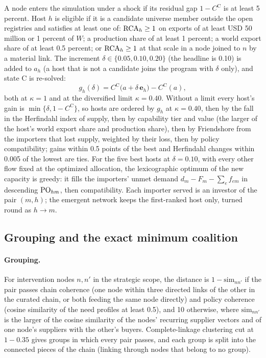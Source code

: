 A node enters the simulation under a shock if its residual gap $1-C^{\mathrm C}$ is at least 5
percent. Host $h$ is eligible if it is a candidate universe member outside the open registries and
satisfies at least one of: $\mathrm{RCA}_h\ge1$ on exports of at least USD 50 million or 1 percent of $W$; a
production share of at least 1 percent; a world export share of at least 0.5 percent; or $\mathrm{RCA}_h\ge1$
at that scale in a node joined to $n$ by a material link. The increment $\delta\in\{0.05,0.10,0.20\}$
(the headline is 0.10) is added to $a_h$ (a host that is not a candidate joins the program with $\delta$
only), and state C is re-solved:
\begin{equation}\label{eq:aib_gain}
  g_h(\delta)=C^{\mathrm C}\bigl(a+\delta\,\mathbf e_h\bigr)-C^{\mathrm C}(a),
\end{equation}
both at $\kappa=1$ and at the diversified limit $\kappa=0.40$. Without a limit every host's gain is
$\min\{\delta,1-C^{\mathrm C}\}$, so hosts are ordered by $g_h$ at $\kappa=0.40$, then by the fall in
the Herfindahl index of supply, then by capability tier and value (the larger of the host's world
export share and production share), then by Friendshore from the importers that lost supply,
weighted by their loss, then by policy compatibility; gains within 0.5 points of the best and
Herfindahl changes within 0.005 of the lowest are ties. For the five best hosts at $\delta=0.10$, with
every other flow fixed at the optimized allocation, the lexicographic optimum of the new capacity is
greedy: it fills the importers' unmet demand $d_m-F_m-\sum_e f_{em}$ in descending $\mathrm{PO}_{hm}$, then
compatibility. Each importer served is an investor of the pair $(m,h)$; the emergent network keeps
the first-ranked host only, turned round as $h\to m$.

\subsection{Grouping and the exact minimum coalition}
\label{subsec:alg_coalition}

\paragraph{Grouping.} For intervention nodes $n,n'$ in the strategic scope, the distance is
$1-\mathrm{sim}_{nn'}$ if the pair passes chain coherence (one node within three directed links of the
other in the curated chain, or both feeding the same node directly) and policy coherence (cosine
similarity of the need profiles at least 0.5), and 10 otherwise, where $\mathrm{sim}_{nn'}$ is the larger
of the cosine similarity of the nodes' recurring supplier vectors and of one node's suppliers with the
other's buyers. Complete-linkage clustering cut at $1-0.35$ gives groups in which every pair passes,
and each group is split into the connected pieces of the chain (linking through nodes that belong to no
group).

